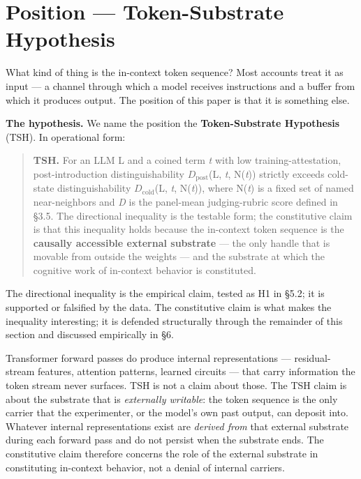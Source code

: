 \documentclass[11pt,a4paper]{article}
\begin{document}
\section{Position --- Token-Substrate Hypothesis}

What kind of thing is the in-context token sequence? Most accounts treat it as input --- a channel through which a model receives instructions and a buffer from which it produces output. The position of this paper is that it is something else.

\textbf{The hypothesis.} We name the position the \textbf{Token-Substrate Hypothesis} (TSH). In operational form:

\begin{quote}
\textbf{TSH.} For an LLM L and a coined term \textit{t} with low training-attestation, post-introduction distinguishability $D_{\text{post}}$(L, \textit{t}, N(\textit{t})) strictly exceeds cold-state distinguishability $D_{\text{cold}}$(L, \textit{t}, N(\textit{t})), where N(\textit{t}) is a fixed set of named near-neighbors and \textit{D} is the panel-mean judging-rubric score defined in \S3.5. The directional inequality is the testable form; the constitutive claim is that this inequality holds because the in-context token sequence is the \textbf{causally accessible external substrate} --- the only handle that is movable from outside the weights --- and the substrate at which the cognitive work of in-context behavior is constituted.
\end{quote}

The directional inequality is the empirical claim, tested as H1 in \S5.2; it is supported or falsified by the data. The constitutive claim is what makes the inequality interesting; it is defended structurally through the remainder of this section and discussed empirically in \S6.

Transformer forward passes \citep{vaswani2017attention} do produce internal representations --- residual-stream features, attention patterns, learned circuits --- that carry information the token stream never surfaces. TSH is not a claim about those. The TSH claim is about the substrate that is \textit{externally writable}: the token sequence is the only carrier that the experimenter, or the model's own past output, can deposit into. Whatever internal representations exist are \textit{derived from} that external substrate during each forward pass and do not persist when the substrate ends. The constitutive claim therefore concerns the role of the external substrate in constituting in-context behavior, not a denial of internal carriers.
\end{document}
